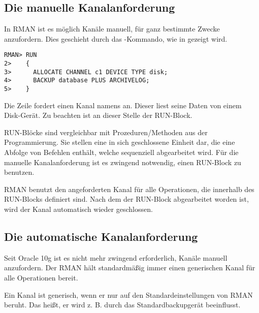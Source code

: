       \subsection{Die manuelle Kanalanforderung}
        In RMAN ist es möglich Kanäle manuell, für ganz bestimmte Zwecke anzufordern. Dies geschieht durch das -Kommando, wie in  gezeigt wird.
        \begin{lstlisting}[caption={Manuelle Kanalanforderung},label=admin1014,language=rman]
RMAN> RUN
2>    {
3>      ALLOCATE CHANNEL c1 DEVICE TYPE disk;
4>      BACKUP database PLUS ARCHIVELOG;
5>    }
        \end{lstlisting}
        Die Zeile  fordert einen Kanal namens  an. Dieser liest seine Daten von einem Disk-Gerät. Zu beachten ist an dieser Stelle der RUN-Block.

        \begin{merke}
          RUN-Blöcke sind vergleichbar mit Prozeduren/Methoden aus der Programmierung. Sie stellen eine in sich geschlossene Einheit dar, die eine Abfolge von Befehlen enthält, welche sequenziell abgearbeitet wird. Für die manuelle Kanalanforderung ist es zwingend notwendig, einen RUN-Block zu benutzen.
        \end{merke}

        RMAN benutzt den angeforderten Kanal für alle Operationen, die innerhalb des RUN-Blocks definiert sind. Nach dem der RUN-Block abgearbeitet worden ist, wird der Kanal automatisch wieder geschlossen.
      \subsection{Die automatische Kanalanforderung}
        Seit Oracle 10g ist es nicht mehr zwingend erforderlich, Kanäle manuell anzufordern. Der RMAN hält standardmäßig immer einen generischen Kanal für alle Operationen bereit.
        \begin{merke}
          Ein Kanal ist generisch, wenn er nur auf den Standardeinstellungen von RMAN beruht. Das heißt, er wird z. B. durch das Standardbackupgerät beeinflusst.
        \end{merke}
